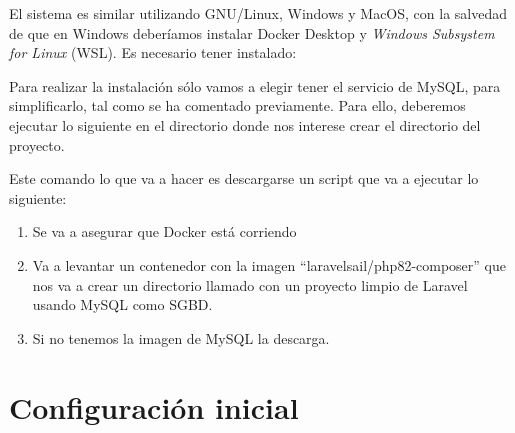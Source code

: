 
El sistema es similar utilizando GNU/Linux, Windows y MacOS, con la salvedad de que en Windows deberíamos instalar Docker Desktop y \textit{Windows Subsystem for Linux} (WSL). Es necesario tener instalado:


Para realizar la instalación sólo vamos a elegir tener el servicio de MySQL, para simplificarlo, tal como se ha comentado previamente. Para ello, deberemos ejecutar lo siguiente en el directorio donde nos interese crear el directorio del proyecto.


Este comando lo que va a hacer es descargarse un script que va a ejecutar lo siguiente:
\begin{enumerate}
    \item Se va a asegurar que Docker está corriendo
    \item Va a levantar un contenedor con la imagen “laravelsail/php82-composer” que nos va a crear un directorio llamado  con un proyecto limpio de Laravel usando MySQL como SGBD.
    \item Si no tenemos la imagen de MySQL la descarga.
\end{enumerate}





\section{Configuración inicial}

